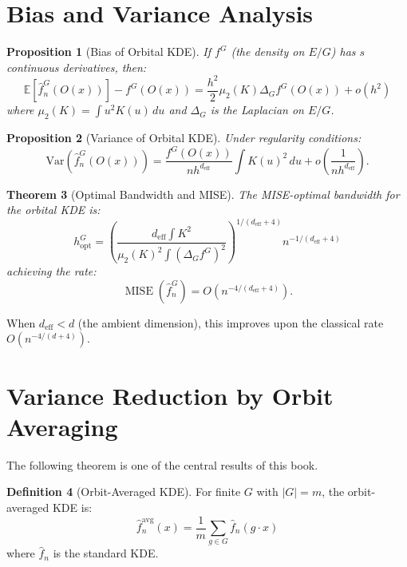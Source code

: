\documentclass[11pt,twoside,openright]{book}
\theoremstyle{plain}
\newtheorem{theorem}{Theorem}[chapter]
\newtheorem{proposition}[theorem]{Proposition}
\theoremstyle{definition}
\newtheorem{definition}[theorem]{Definition}
\theoremstyle{remark}
\newcommand{\E}{\mathbb{E}}
\newcommand{\var}{\mathrm{Var}}
\newcommand{\deff}{d_{\mathrm{eff}}}
\DeclareMathOperator{\MISE}{MISE}
\begin{document}
\section{Bias and Variance Analysis}

\begin{proposition}[Bias of Orbital KDE]
\label{prop:kde-bias}
If $f^G$ (the density on $E/G$) has $s$ continuous derivatives, then:
\begin{equation}
\E[\hat{f}_n^G(O(x))] - f^G(O(x)) = \frac{h^2}{2} \mu_2(K) \Delta_G f^G(O(x)) + o(h^2)
\label{eq:kde-bias}
\end{equation}
where $\mu_2(K) = \int u^2 K(u) \, du$ and $\Delta_G$ is the Laplacian on $E/G$.
\end{proposition}

\begin{proposition}[Variance of Orbital KDE]
\label{prop:kde-variance}
Under regularity conditions:
\begin{equation}
\var(\hat{f}_n^G(O(x))) = \frac{f^G(O(x))}{nh^{\deff}} \int K(u)^2 \, du + o\left(\frac{1}{nh^{\deff}}\right).
\label{eq:kde-variance}
\end{equation}
\end{proposition}

\begin{theorem}[Optimal Bandwidth and MISE]
\label{thm:kde-optimal}
The MISE-optimal bandwidth for the orbital KDE is:
\begin{equation}
h_{\text{opt}}^G = \left(\frac{\deff \int K^2}{\mu_2(K)^2 \int (\Delta_G f^G)^2}\right)^{1/(\deff+4)} n^{-1/(\deff+4)}
\label{eq:kde-optimal-h}
\end{equation}
achieving the rate:
\begin{equation}
\MISE(\hat{f}_n^G) = O(n^{-4/(\deff+4)}).
\label{eq:kde-mise-rate}
\end{equation}
\end{theorem}

When $\deff < d$ (the ambient dimension), this improves upon the classical rate $O(n^{-4/(d+4)})$.

\section{Variance Reduction by Orbit Averaging}

The following theorem is one of the central results of this book.

\begin{definition}[Orbit-Averaged KDE]
For finite $G$ with $|G| = m$, the orbit-averaged KDE is:
\begin{equation}
\hat{f}_n^{\text{avg}}(x) = \frac{1}{m} \sum_{g \in G} \hat{f}_n(g \cdot x)
\label{eq:orbit-avg-kde}
\end{equation}
where $\hat{f}_n$ is the standard KDE.
\end{definition}
\end{document}
